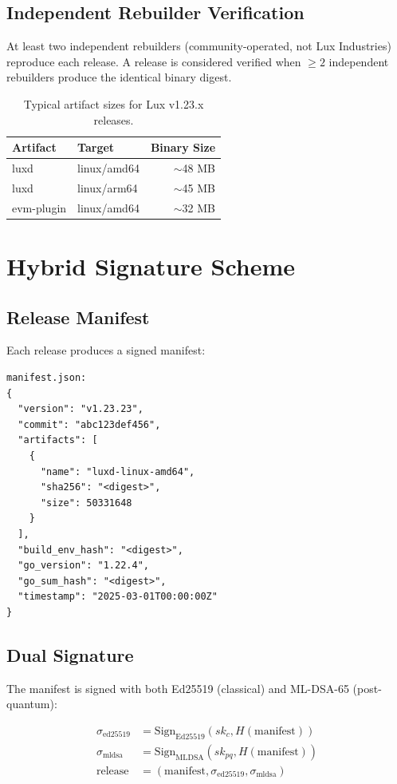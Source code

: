 \documentclass[11pt]{article}
\begin{document}
\subsection{Independent Rebuilder Verification}

At least two independent rebuilders (community-operated, not Lux Industries) reproduce each release. A release is considered verified when $\geq 2$ independent rebuilders produce the identical binary digest.

\begin{table}[h]
\centering
\begin{tabular}{@{}llr@{}}
\toprule
\textbf{Artifact} & \textbf{Target} & \textbf{Binary Size} \\
\midrule
luxd & linux/amd64 & $\sim$48 MB \\
luxd & linux/arm64 & $\sim$45 MB \\
evm-plugin & linux/amd64 & $\sim$32 MB \\
\bottomrule
\end{tabular}
\caption{Typical artifact sizes for Lux v1.23.x releases.}
\label{tab:artifacts}
\end{table}

\section{Hybrid Signature Scheme}

\subsection{Release Manifest}

Each release produces a signed manifest:

\begin{verbatim}
manifest.json:
{
  "version": "v1.23.23",
  "commit": "abc123def456",
  "artifacts": [
    {
      "name": "luxd-linux-amd64",
      "sha256": "<digest>",
      "size": 50331648
    }
  ],
  "build_env_hash": "<digest>",
  "go_version": "1.22.4",
  "go_sum_hash": "<digest>",
  "timestamp": "2025-03-01T00:00:00Z"
}
\end{verbatim}

\subsection{Dual Signature}

The manifest is signed with both Ed25519 (classical) and ML-DSA-65 (post-quantum):

\begin{align}
\sigma_{\text{ed25519}} &= \text{Sign}_{\text{Ed25519}}(sk_c, H(\text{manifest})) \\
\sigma_{\text{mldsa}} &= \text{Sign}_{\text{MLDSA}}(sk_{pq}, H(\text{manifest})) \\
\text{release} &= (\text{manifest}, \sigma_{\text{ed25519}}, \sigma_{\text{mldsa}})
\end{align}
\end{document}
